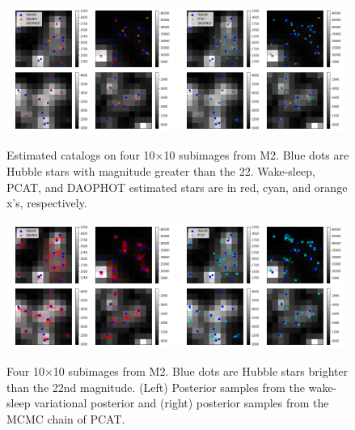 \begin{figure}[H]
    \centering
    \includegraphics[width=0.49\textwidth]{figures/example_subimages_ws.png}
    \includegraphics[width=0.49\textwidth]{figures/example_subimages_pcat.png}
    \caption{Estimated catalogs on four 10$\times$10 subimages from
    M2. Blue dots are Hubble stars with magnitude greater than the 22.
    Wake-sleep, PCAT, and DAOPHOT estimated stars are in
    red, cyan, and orange x's, respectively. }
    \label{fig:example_subimages}
\end{figure}

\begin{figure}[H]
    \centering
    \includegraphics[width=0.49\textwidth]{figures/example_subimages_samples_ws.png}
    \includegraphics[width=0.49\textwidth]{figures/example_subimages_samples_pcat.png}
    \caption{Four 10$\times$10 subimages from
    M2. Blue dots are Hubble stars brighter than the 22nd magnitude. (Left) Posterior samples from the wake-sleep variational
    posterior and (right) posterior samples from the MCMC chain of PCAT. }
    \label{fig:example_subimages_sampled}
\end{figure}

